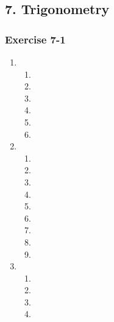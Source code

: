 \subsection* {7. Trigonometry}
\begin{multicols}{3}
\subsubsection*{Exercise 7-1} %
\begin{enumerate}[noitemsep, label=\textbf{\arabic*}. ]
\item %
\begin{enumerate}[noitemsep, label=\textbf{(\alph*)} ]
 \item 
\item 
\item 
\item 
\item 
\item 
\end{enumerate}



\item %
\begin{enumerate}[noitemsep, label=\textbf{(\alph*)} ]
\item %
\item %
\item %
\item %
\item %
\item %
\item %
\item %
\item %
\end{enumerate}

\item %
\begin{enumerate}[noitemsep, label=\textbf{(\alph*)} ]
\item %
\item %
\item %
\item %
\end{enumerate}



\end{enumerate}
\end{multicols}
